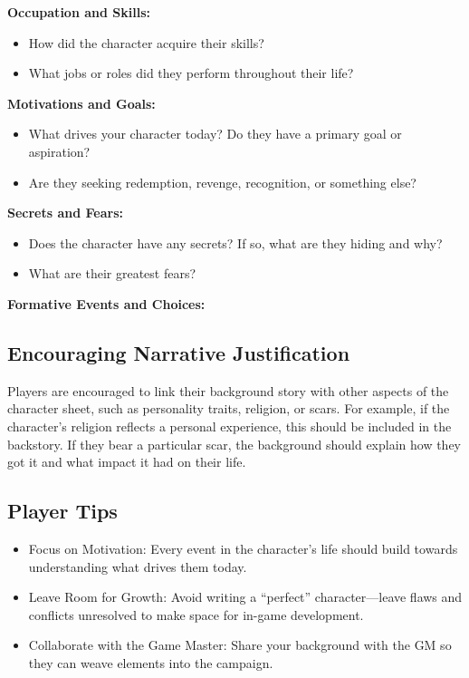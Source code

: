 \textbf{Occupation and Skills:}

\begin{itemize}
\tightlist
\item
  How did the character acquire their skills?
\item
  What jobs or roles did they perform throughout their life?
\end{itemize}

\textbf{Motivations and Goals:}

\begin{itemize}
\tightlist
\item
  What drives your character today? Do they have a primary goal or
  aspiration?
\item
  Are they seeking redemption, revenge, recognition, or something else?
\end{itemize}

\textbf{Secrets and Fears:}

\begin{itemize}
\tightlist
\item
  Does the character have any secrets? If so, what are they hiding and
  why?
\item
  What are their greatest fears?
\end{itemize}

\textbf{Formative Events and Choices:}

\hypertarget{encouraging-narrative-justification}{%
\subsection{Encouraging Narrative
Justification}\label{encouraging-narrative-justification}}

Players are encouraged to link their background story with other aspects
of the character sheet, such as personality traits, religion, or scars.
For example, if the character's religion reflects a personal experience,
this should be included in the backstory. If they bear a particular
scar, the background should explain how they got it and what impact it
had on their life.

\hypertarget{player-tips}{%
\subsection{Player Tips}\label{player-tips}}

\begin{itemize}
\tightlist
\item
  Focus on Motivation: Every event in the character's life should build
  towards understanding what drives them today.
\item
  Leave Room for Growth: Avoid writing a ``perfect'' character---leave
  flaws and conflicts unresolved to make space for in-game development.
\item
  Collaborate with the Game Master: Share your background with the GM so
  they can weave elements into the campaign.
\end{itemize}

